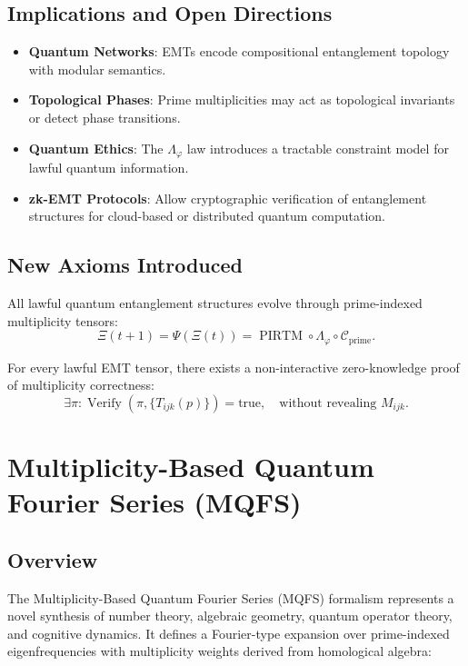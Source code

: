 \documentclass[12]{amsart}
\theoremstyle{plain}
\begin{document}
\subsection{Implications and Open Directions}

\begin{itemize}
  \item \textbf{Quantum Networks}: EMTs encode compositional entanglement topology with modular semantics.
  \item \textbf{Topological Phases}: Prime multiplicities may act as topological invariants or detect phase transitions.
  \item \textbf{Quantum Ethics}: The $\Lambda_\varphi$ law introduces a tractable constraint model for lawful quantum information.
  \item \textbf{zk-EMT Protocols}: Allow cryptographic verification of entanglement structures for cloud-based or distributed quantum computation.
\end{itemize}

\subsection{New Axioms Introduced}

\begin{axiom}
All lawful quantum entanglement structures evolve through prime-indexed multiplicity tensors:
\[
\Xi(t+1) = \Psi(\Xi(t)) = \operatorname{PIRTM} \circ \Lambda_\varphi \circ \mathcal{C}_{\text{prime}}.
\]
\end{axiom}

\begin{axiom}
For every lawful EMT tensor, there exists a non-interactive zero-knowledge proof of multiplicity correctness:
\[
\exists \pi : \operatorname{Verify}(\pi, \{T_{ijk}(p)\}) = \text{true}, \quad \text{without revealing } M_{ijk}.
\]
\end{axiom}

\section{Multiplicity-Based Quantum Fourier Series (MQFS)}

\subsection{Overview}

The Multiplicity-Based Quantum Fourier Series (MQFS) formalism represents a novel synthesis of number theory, algebraic geometry, quantum operator theory, and cognitive dynamics. It defines a Fourier-type expansion over prime-indexed eigenfrequencies with multiplicity weights derived from homological algebra:
\end{document}
